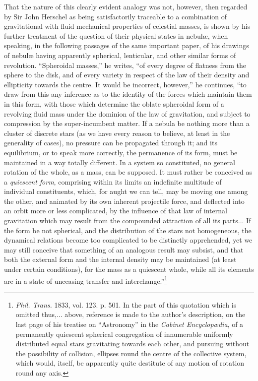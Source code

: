 \documentclass[a4paper, 12pt, oneside, polutonikogreek, english]{article}
\begin{document}
That the nature of this clearly evident analogy was not, however, then regarded by Sir John Herschel as being satisfactorily traceable to a combination of gravitational with fluid mechanical properties of celestial masses, is shown by his further treatment of the question of their physical states in nebulæ, when speaking, in the following passages of the same important paper, of his drawings of nebulæ having apparently spherical, lenticular, and other similar forms of revolution. ``Spheroidal masses,'' he writes, ``of every degree of flatness from the sphere to the disk, and of every variety in respect of the law of their density and ellipticity towards the centre. It would be incorrect, however,'' he continues, ``to draw from this any inference as to the identity of the forces which maintain them in this form, with those which determine the oblate spheroidal form of a revolving fluid mass under the dominion of the law of gravitation, and subject to compression by the super-incumbent matter. If a nebula be nothing more than a cluster of discrete stars (as we have every reason to believe, at least in the generality of cases), no pressure can be propagated through it; and its equilibrium, or to speak more correctly, the permanence of its form, must be maintained in a way totally different. In a system so constituted, no general rotation of the whole, as a mass, can be supposed. It must rather be conceived as a \emph{quiescent form}, comprising within its limits an indefinite multitude of individual constituents, which, for aught we can tell, may be moving one among the other, and animated by its own inherent projectile force, and deflected into an orbit more or less complicated, by the influence of that law of internal gravitation which may result from the compounded attraction of all its parts... If the form be not spherical, and the distribution of the stars not homogeneous, the dynamical relations become too complicated to be distinctly apprehended, yet we may still conceive that something of an analogous result may subsist, and that both the external form and the internal density may be maintained (at least under certain conditions), for the mass as a quiescent whole, while all its elements are in a state of unceasing transfer and interchange.''\footnote{\emph{Phil. Trans.} 1833, vol. 123. p. 501. In the part of this quotation which is omitted thus,... above, reference is made to the author's description, on the last page of his treatise on ``Astronomy'' in the \emph{Cabinet Encyclopædia}, of a permanently quiescent spherical congregation of innumerable uniformly distributed equal stars gravitating towards each other, and pursuing without the possibility of collision, ellipses round the centre of the collective system, which would, itself, be apparently quite destitute of any motion of rotation round any axis.}
\end{document}
